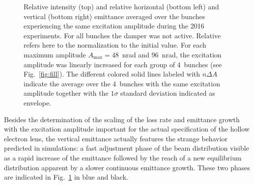 \documentclass[%
 reprint,
 amsmath,amssymb,
 aps,
prstab,
]{revtex4-1}
\begin{document}
\begin{figure}[h]
\begin{minipage}[t]{0.49\linewidth}
	\end{minipage}	
	\caption{\label{fig:10thexp} Relative intensity (top) and relative horizontal (bottom left) and vertical (bottom right) emittance averaged over the bunches experiencing the same excitation amplitude during the 2016 experiments. For all bunches the damper was not active. Relative refers here to the normalization to the initial value. For each maximum amplitude $A_{\mathrm{max}}=48$~nrad and 96~nrad, the excitation amplitude was linearly increased for each group of 4~bunches (see Fig.~\ref{fig:fill}). The different colored solid lines labeled with $n\Delta A$ indicate the average over the 4~bunches with the same excitation amplitude together with the $1\sigma$ standard deviation indicated as envelope.}
\end{figure}

Besides the determination of the scaling of the loss rate and emittance growth with the excitation amplitude important for the actual specification of the hollow electron lens, the vertical emittance actually features the strange behavior predicted in simulations: a fast adjustment phase of the beam distribution visible as a rapid increase of the emittance followed by the reach of a new equilibrium distribution apparent by a slower continuous emittance growth. These two phases are indicated in Fig.~\ref{fig:10thexp} in blue and black.
\end{document}
